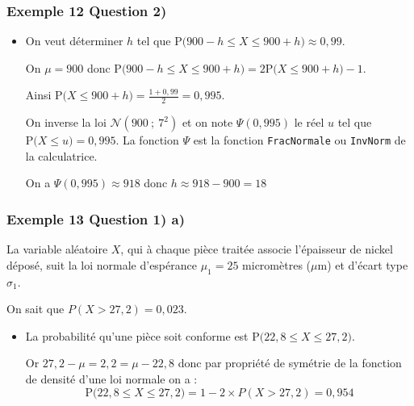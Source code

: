 \documentclass[xcolor=svgnames,t,final]{beamer}
\newcommand{\loinorm}[2]{\mathcal{N}\left(#1\ ; \ #2 \right)}
\newcommand{\proba}[1]{\text{P}\big(#1\big)}
\begin{document}
\begin{frame}

\frametitle{Exemple 12 Question 2)}

\begin{itemize}


	
	\item On veut déterminer $h$ tel que $\proba{900 - h \leqslant X \leqslant 900 + h} \approx 0,99$.
	
	On $\mu= 900$ donc  $\proba{900 - h \leqslant X \leqslant 900 + h} = 2 \proba{X \leqslant 900 + h} - 1$.
	
	Ainsi $ \proba{X \leqslant 900 + h}  = \frac{1+ 0,99}{2} = 0,995$.
	
	
On inverse la loi $\loinorm{900}{7^2}$ et on note $\Psi(0,995)$ le réel $u$ tel que $\proba{X \leqslant u} = 0,995$.
La fonction $\Psi$ est la fonction \texttt{FracNormale} ou \texttt{InvNorm} de la calculatrice.

On a $\Psi(0,995) \approx 918$ donc $\boxed{h \approx 918 - 900 = 18}$
\end{itemize}


\end{frame}




\begin{frame}

\frametitle{Exemple 13 Question 1) a)}
\label{exemple13}

La variable aléatoire $X$, qui à chaque pièce traitée associe l'épaisseur de nickel déposé, suit la loi normale d'espérance $\mu_1 = 25$ micromètres ($\mu$m) et d'écart type $\sigma_1$. 

On sait que $P(X > 27,2) = 0,023$. 


\begin{itemize}

	\item La probabilité qu'une pièce soit conforme est $\proba{22,8 \leqslant X \leqslant 27,2}$.
	
	Or $27,2 - \mu = 2,2 = \mu -22,8$ donc par propriété de symétrie de la fonction de densité d'une loi normale on a :
	\begin{equation*}
	\boxed{\proba{22,8 \leqslant X \leqslant 27,2} = 1 - 2 \times P(X > 27,2)  = 0,954}
	\end{equation*}
	

\end{itemize}


\end{frame}
\end{document}
